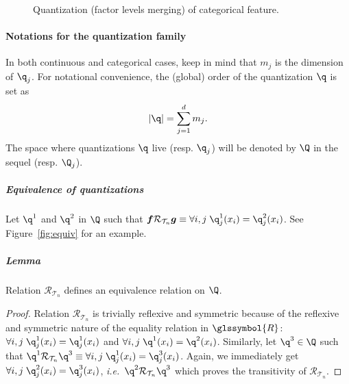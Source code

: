 \begin{figure}[!ht]
\begin{multicols}{2}
\begin{minipage}{0.45\textwidth}
\caption{\label{fig:disc_disc} Quantization (factor levels merging) of categorical feature.}
\end{minipage}
\end{multicols}
\end{figure}


\paragraph{Notations for the quantization family}

In both continuous and categorical cases, keep in mind that $m_j$ is the dimension of $\q_j$. For notational convenience, the (global) order of the quantization $\q$ is set as 
\[|\q|=\sum_{j=1}^d m_j.\]
The space where quantizations $\q$ live (resp. $\q_j$) will be denoted by $\Q$ in the sequel (resp. $\Q_j$).

\subparagraph{Equivalence of quantizations} \label{par:equiv}

Let $\q^1$ and $\q^2$ in $\Q$ such that $\boldsymbol{f} \mathcal{R}_{\mathcal{T}_n} \boldsymbol{g} \equiv \forall i,j \; \q^1_j(x_i) = \q^2_j(x_i)$. See Figure~\ref{fig:equiv} for an example.

\subparagraph{Lemma} Relation $\mathcal{R}_{\mathcal{T}_n}$ defines an equivalence relation on $\Q$.

\begin{proof}
Relation $\mathcal{R}_{\mathcal{T}_n}$ is trivially reflexive and symmetric because of the reflexive and symmetric nature of the equality relation in $\glssymbol{R}$: $\forall i,j \; \q^1_j(x_i) = \q^1_j(x_i)$ and $\forall i,j \; \q^1(x_i) = \q^2(x_i)$. Similarly, let $\q^3 \in \Q$ such that $\q^1 \mathcal{R}_{\mathcal{T}_n} \q^3  \equiv \forall i,j \; \q^1_j(x_i) = \q^3_j(x_i)$. Again, we immediately get $\forall i,j \; \q^2_j(x_i) = \q^3_j(x_i)$, \textit{i.e.}\ $\q^2 \mathcal{R}_{\mathcal{T}_n} \q^3$ which proves the transitivity of $\mathcal{R}_{\mathcal{T}_n}$.
\end{proof}

